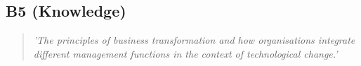 \subsection{B5 (Knowledge)}

  \begin{quote}
    \textit{'The principles of business
    transformation and how organisations integrate different
    management functions in the context of technological
    change.'}
  \end{quote}

\newpage